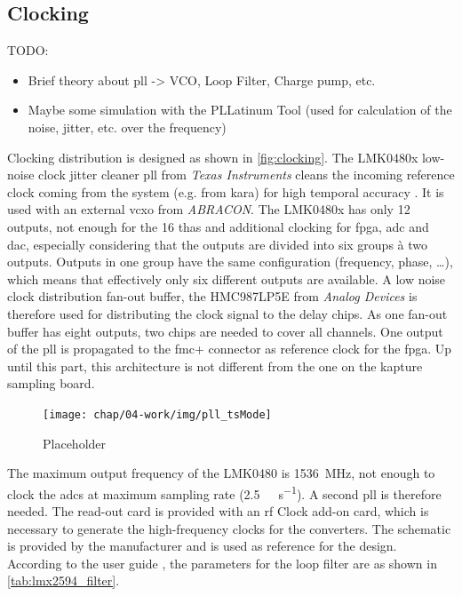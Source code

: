 \subsection{Clocking}
TODO:
\begin{itemize}
	\item Brief theory about \gls{pll} -> VCO, Loop Filter, Charge pump, etc.
	\item Maybe some simulation with the PLLatinum Tool (used for calculation of the noise, jitter, etc. over the frequency)
\end{itemize}
Clocking distribution is designed as shown in \autoref{fig:clocking}.
The LMK0480x low-noise clock jitter cleaner \gls{pll} from \textit{Texas Instruments} cleans the incoming reference clock coming from the system (e.g. from \gls{kara}) for high temporal accuracy \cite{caselle2013}.
It is used with an external \gls{vcxo} from \textit{ABRACON}.
The LMK0480x has only 12 outputs, not enough for the 16 \glspl{tha} and additional clocking for \gls{fpga}, \gls{adc} and \gls{dac}, especially considering that the outputs are divided into six groups à two outputs. Outputs in one group have the same configuration (frequency, phase, \ldots), which means that effectively only six different outputs are available.
A low noise clock distribution fan-out buffer, the HMC987LP5E from \textit{Analog Devices} is therefore used for distributing the clock signal to the delay chips.
As one fan-out buffer has eight outputs, two chips are needed to cover all channels.
One output of the \gls{pll} is propagated to the \gls{fmc}+ connector as reference clock for the \gls{fpga}.
Up until this part, this architecture is not different from the one on the \gls{kapture} sampling board. 

\begin{figure}[tbh]
	\centering
	\texttt{[image: chap/04-work/img/pll\_tsMode]}
	\caption{Placeholder}
	\label{fig:clocking}
\end{figure}

The maximum output frequency of the LMK0480 is \SI{1536}{\MHz}, not enough to clock the \glspl{adc} at maximum sampling rate (\SI{2.5}{\giga\sample\per\second}).
A second \gls{pll} is therefore needed. The read-out card is provided with an \gls{rf} Clock add-on card, which is necessary to generate the high-frequency clocks for the converters.
The schematic is provided by the manufacturer and is used as reference for the design.
According to the user guide \cite{xilCLK104}, the parameters for the loop filter are as shown in \autoref{tab:lmx2594_filter}.


